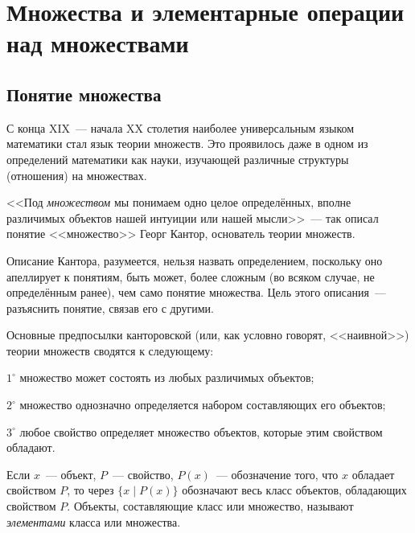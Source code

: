 
\section{Множества и элементарные операции над множествами}

\subsection{Понятие множества}

С конца XIX~--- начала XX столетия наиболее универсальным языком математики стал язык теории множеств. Это проявилось даже в одном из определений математики как науки, изучающей различные структуры (отношения) на множествах\footnotemark[1].


<<Под \emph{множеством} мы понимаем одно целое определённых, вполне различимых объектов нашей интуиции или нашей мысли>>~--- так описал понятие <<множество>> Георг Кантор\footnotemark[2], основатель теории множеств.


Описание Кантора, разумеется, нельзя назвать определением, поскольку оно апеллирует к понятиям, быть может, более сложным (во всяком случае, не определённым ранее), чем само понятие множества. Цель этого описания~--- разъяснить понятие, связав его с другими.

Основные предпосылки канторовской (или, как условно говорят, <<наивной>>) теории множеств сводятся к следующему:

$1^\circ$ множество может состоять из любых различимых объектов;

$2^\circ$ множество однозначно определяется набором составляющих его объектов;

$3^\circ$ любое свойство определяет множество объектов, которые этим свойством обладают.

Если $x$~--- объект, $P$~--- свойство, $P(x)$~--- обозначение того, что $x$ обладает свойством $P$, то через $\{x \mid P(x)\}$ обозначают весь класс объектов, обладающих свойством $P$. Объекты, составляющие класс или множество, называют \emph{элементами} класса или множества.

